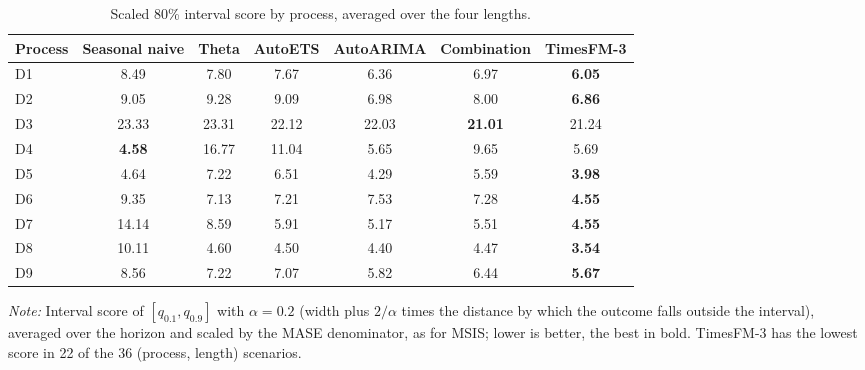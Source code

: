 \documentclass[ASNA]{USG}
\begin{document}
\begin{table}[!htbp]
\centering
\begin{threeparttable}
\caption{Scaled 80\% interval score by process, averaged over the four lengths.}
\label{tab:si-is}
\small\setlength{\tabcolsep}{4pt}
\begin{tabular}{lcccccc}
\toprule
Process & Seasonal naive & Theta & AutoETS & AutoARIMA & Combination & TimesFM-3 \\
\midrule
D1 & 8.49 & 7.80 & 7.67 & 6.36 & 6.97 & \textbf{6.05} \\
D2 & 9.05 & 9.28 & 9.09 & 6.98 & 8.00 & \textbf{6.86} \\
D3 & 23.33 & 23.31 & 22.12 & 22.03 & \textbf{21.01} & 21.24 \\
D4 & \textbf{4.58} & 16.77 & 11.04 & 5.65 & 9.65 & 5.69 \\
D5 & 4.64 & 7.22 & 6.51 & 4.29 & 5.59 & \textbf{3.98} \\
D6 & 9.35 & 7.13 & 7.21 & 7.53 & 7.28 & \textbf{4.55} \\
D7 & 14.14 & 8.59 & 5.91 & 5.17 & 5.51 & \textbf{4.55} \\
D8 & 10.11 & 4.60 & 4.50 & 4.40 & 4.47 & \textbf{3.54} \\
D9 & 8.56 & 7.22 & 7.07 & 5.82 & 6.44 & \textbf{5.67} \\
\bottomrule
\end{tabular}
\begin{tablenotes}[flushleft]\footnotesize
\item \textit{Note:} Interval score of $[q_{0.1}, q_{0.9}]$ with $\alpha = 0.2$ (width plus $2/\alpha$ times the distance by which the outcome falls outside the interval), averaged over the horizon and scaled by the MASE denominator, as for MSIS; lower is better, the best in bold. TimesFM-3 has the lowest score in 22 of the 36 (process, length) scenarios.
\end{tablenotes}
\end{threeparttable}
\end{table}
\end{document}

